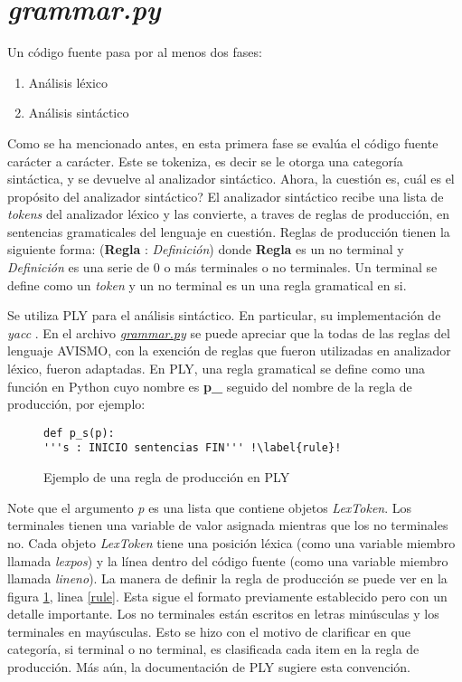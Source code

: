 \section{\textit{grammar.py}}
Un código fuente pasa por al menos dos fases:
\begin{enumerate}
	\item Análisis léxico
	\item Análisis sintáctico
\end{enumerate}

Como se ha mencionado antes, en esta primera fase se evalúa el código fuente carácter a carácter.
Este se tokeniza, es decir se le otorga una categoría sintáctica, y se devuelve al analizador sintáctico.
Ahora, la cuestión es, cuál es el propósito del analizador sintáctico?
El analizador sintáctico recibe una lista de \textit{tokens} del analizador léxico y las convierte, a traves de reglas de producción, en sentencias gramaticales del lenguaje en cuestión.
Reglas de producción tienen la siguiente forma: (\textbf{Regla} : \textit{Definición}) donde \textbf{Regla} es un no terminal y \textit{Definición} es una serie de 0 o más terminales o no terminales.
Un terminal se define como un \textit{token} y un no terminal es un una regla gramatical en si.

Se utiliza PLY \cite{noauthor_ply_nodate} para el análisis sintáctico. En particular, su implementación de \textit{yacc} \cite{noauthor_man_nodate}.
En el archivo \href{https://github.com/aramis-matos/comp4999_compilers_project/blob/master/code/python_remake/grammar.py}{\textit{grammar.py}} se puede apreciar que la todas de las reglas del lenguaje AVISMO, con la exención de reglas que fueron utilizadas en analizador léxico, fueron adaptadas.
En PLY, una regla gramatical se define como una función en Python cuyo nombre es \textbf{p\_} seguido del nombre de la regla de producción, por ejemplo:
\begin{figure}[H]
	\begin{verbatim}
def p_s(p):
'''s : INICIO sentencias FIN''' !\label{rule}!
	\end{verbatim}
	\caption{Ejemplo de una regla de producción en PLY}
	\label{fig: grammarRuleExample}
\end{figure}
Note que el argumento \textit{p} es una lista que contiene objetos \textit{LexToken}.
Los terminales tienen una variable de valor asignada mientras que los no terminales no.
Cada objeto \textit{LexToken} tiene una posición léxica (como una variable miembro llamada \textit{lexpos}) y la línea dentro del código fuente  (como una variable miembro llamada \textit{lineno}).
La manera de definir la regla de producción se puede ver en la figura \ref{fig: grammarRuleExample}, linea \ref{rule}.
Esta sigue el formato previamente establecido pero con un detalle importante.
Los no terminales están escritos en letras minúsculas y los terminales en mayúsculas.
Esto se hizo con el motivo de clarificar en que categoría, si terminal o no terminal, es clasificada cada item en la regla de producción.
Más aún, la documentación de PLY sugiere esta convención.

